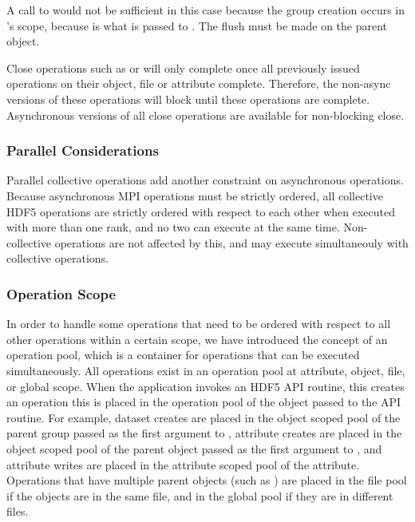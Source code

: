 \documentclass[../users_guide.tex]{subfiles}
\begin{document}
A call to  would not be sufficient
in this case because the group creation occurs in 's scope,
because  is what is passed to
. The flush must be made on the parent object.

Close operations such as  or 
will only complete once all previously issued operations on their object, file
or attribute complete. Therefore, the non-async versions of these operations
will block until these operations are complete. Asynchronous versions of all
close operations are available for non-blocking close.

\subsubsection {Parallel Considerations}

Parallel collective operations add another constraint on asynchronous
operations. Because asynchronous MPI operations must be strictly ordered, all
collective HDF5 operations are strictly ordered with respect to each other when
executed with more than one rank, and no two can execute at the same time.
Non-collective operations are not affected by this, and may execute
simultaneouly with collective operations.

\subsubsection {Operation Scope}

In order to handle some operations that need to be ordered with respect to all
other operations within a certain scope, we have introduced the concept of an
operation pool, which is a container for operations that can be executed
simultaneously. All operations exist in an operation pool at attribute, object,
file, or global scope. When the application invokes an HDF5 API routine, this
creates an operation this is placed in the operation pool of the object passed
to the API routine. For example, dataset creates are placed in the object scoped
pool of the parent group passed as the first argument to
, attribute creates are placed in the object scoped
pool of the parent object passed as the first argument to
, and attribute writes are placed in the attribute
scoped pool of the attribute. Operations that have multiple parent objects (such
as ) are placed in the file pool if the objects are in
the same file, and in the global pool if they are in different files.
\end{document}
